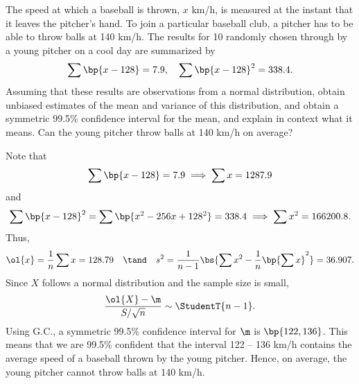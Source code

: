 \begin{problem}
    The speed at which a baseball is thrown, $x$ km/h, is measured at the instant that it leaves the pitcher's hand. To join a particular baseball club, a pitcher has to be able to throw balls at 140 km/h. The results for 10 randomly chosen through by a young pitcher on a cool day are summarized by \[\sum \bp{x - 128} = 7.9, \quad \sum \bp{x - 128}^2 = 338.4.\] Assuming that these results are observations from a normal distribution, obtain unbiased estimates of the mean and variance of this distribution, and obtain a symmetric 99.5\% confidence interval for the mean, and explain in context what it means. Can the young pitcher throw balls at 140 km/h on average?
\end{problem}
\begin{solution}
    Note that \[\sum \bp{x - 128} = 7.9 \implies \sum x = 1287.9\] and \[\sum \bp{x - 128}^2 = \sum \bp{x^2 - 256 x + 128^2} = 338.4 \implies \sum x^2 = 166200.8.\] Thus, \[\ol{x} = \frac1n \sum x = 128.79 \quad \tand \quad s^2 = \frac1{n-1} \bs{\sum x^2 - \frac1n \bp{\sum x}^2} = 36.907.\] Since $X$ follows a normal distribution and the sample size is small, \[\frac{\ol{X} - \m}{S / \sqrt{n}} \sim \StudentT{n-1}.\] Using G.C., a symmetric 99.5\% confidence interval for $\m$ is $\bp{122, 136}$. This means that we are 99.5\% confident that the interval 122 -- 136 km/h contains the average speed of a baseball thrown by the young pitcher. Hence, on average, the young pitcher cannot throw balls at 140 km/h.
\end{solution}

